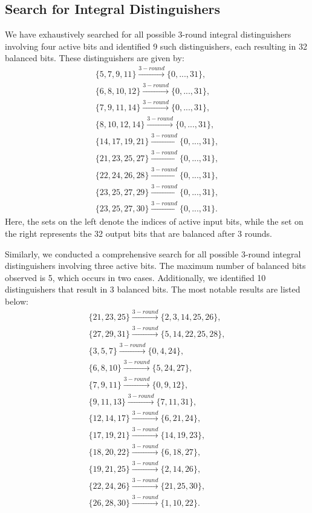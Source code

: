 \documentclass[a4paper]{llncs}
\begin{document}
\subsection{Search for Integral Distinguishers}
We have exhaustively searched for all possible 3-round integral distinguishers involving four active bits and identified 9 such distinguishers, each resulting in 32 balanced bits. These distinguishers are given by:
\begin{equation*}
\begin{split}
\{5,7,9,11\}\xrightarrow{3-round}\{0,...,31\}, \\
\{6,8,10,12\}\xrightarrow{3-round}\{0,...,31\}, \\
\{7,9,11,14\}\xrightarrow{3-round}\{0,...,31\}, \\
\{8,10,12,14\}\xrightarrow{3-round}\{0,...,31\}, \\
\{14,17,19,21\}\xrightarrow{3-round}\{0,...,31\}, \\
\{21,23,25,27\}\xrightarrow{3-round}\{0,...,31\}, \\
\{22,24,26,28\}\xrightarrow{3-round}\{0,...,31\}, \\
\{23,25,27,29\}\xrightarrow{3-round}\{0,...,31\}, \\
\{23,25,27,30\}\xrightarrow{3-round}\{0,...,31\}.
\end{split}
\end{equation*}
Here, the sets on the left denote the indices of active input bits, while the set on the right represents the 32 output bits that are balanced after 3 rounds.

Similarly, we conducted a comprehensive search for all possible 3-round integral distinguishers involving three active bits. The maximum number of balanced bits observed is 5, which occurs in two cases. Additionally, we identified 10 distinguishers that result in 3 balanced bits. The most notable results are listed below:
\begin{equation*}
\begin{split}
\{21,23,25\}\xrightarrow{3-round}\{2,3,14,25,26\}, \\
\{27,29,31\}\xrightarrow{3-round}\{5,14,22,25,28\}, \\
\{3,5,7\}\xrightarrow{3-round}\{0,4,24\}, \\
\{6,8,10\}\xrightarrow{3-round}\{5,24,27\}, \\
\{7,9,11\}\xrightarrow{3-round}\{0,9,12\}, \\
\{9,11,13\}\xrightarrow{3-round}\{7,11,31\}, \\
\{12,14,17\}\xrightarrow{3-round}\{6,21,24\}, \\
\{17,19,21\}\xrightarrow{3-round}\{14,19,23\}, \\
\{18,20,22\}\xrightarrow{3-round}\{6,18,27\}, \\
\{19,21,25\}\xrightarrow{3-round}\{2,14,26\}, \\
\{22,24,26\}\xrightarrow{3-round}\{21,25,30\}, \\
\{26,28,30\}\xrightarrow{3-round}\{1,10,22\}.
\end{split}
\end{equation*}
\end{document}
